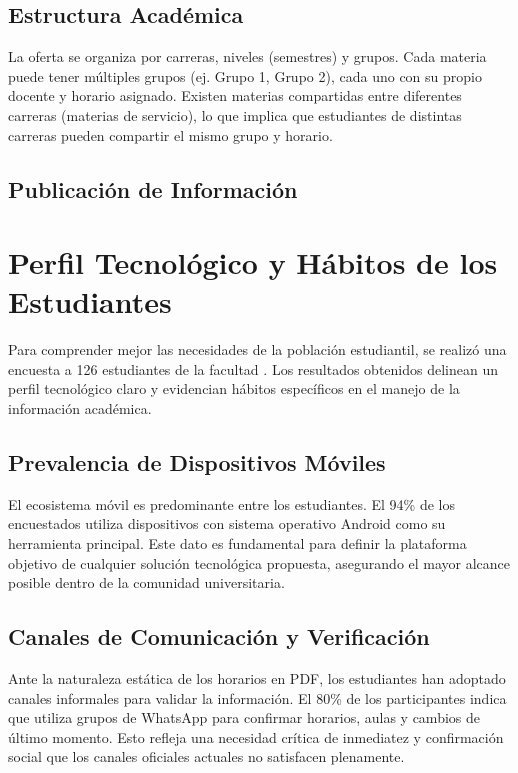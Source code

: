 \subsection{Estructura Académica}

La oferta se organiza por carreras, niveles (semestres) y grupos. Cada materia puede tener múltiples grupos (ej. Grupo 1, Grupo 2), cada uno con su propio docente y horario asignado. Existen materias compartidas entre diferentes carreras (materias de servicio), lo que implica que estudiantes de distintas carreras pueden compartir el mismo grupo y horario.

\subsection{Publicación de Información}


\section{Perfil Tecnológico y Hábitos de los Estudiantes}

Para comprender mejor las necesidades de la población estudiantil, se realizó una encuesta a 126 estudiantes de la facultad \cite{encuesta_fcyt_2025}. Los resultados obtenidos delinean un perfil tecnológico claro y evidencian hábitos específicos en el manejo de la información académica.

\subsection{Prevalencia de Dispositivos Móviles}

El ecosistema móvil es predominante entre los estudiantes. El 94\% de los encuestados utiliza dispositivos con sistema operativo Android como su herramienta principal. Este dato es fundamental para definir la plataforma objetivo de cualquier solución tecnológica propuesta, asegurando el mayor alcance posible dentro de la comunidad universitaria.

\subsection{Canales de Comunicación y Verificación}

Ante la naturaleza estática de los horarios en PDF, los estudiantes han adoptado canales informales para validar la información. El 80\% de los participantes indica que utiliza grupos de WhatsApp para confirmar horarios, aulas y cambios de último momento. Esto refleja una necesidad crítica de inmediatez y confirmación social que los canales oficiales actuales no satisfacen plenamente.

